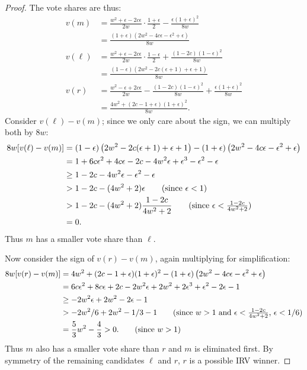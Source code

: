 \documentclass{article}
\theoremstyle{theorem}
\theoremstyle{definition}
\begin{document}
\begin{proof}
The vote shares are thus:
\begin{align*}
  v(m)   &= \frac{w^2 + \epsilon - 2c\epsilon}{2w} \cdot \frac{1+\epsilon}{2} - \frac{\epsilon  (1+\epsilon)^2}{8 w} \\
  &= \frac{(1+\epsilon) \left(2 w^2-4 c \epsilon-\epsilon ^2+\epsilon \right)}{8 w}\\[0.5em]
  v(\ell)   &= \frac{w^2 + \epsilon - 2c\epsilon}{2w} \cdot \frac{1-\epsilon}{2} + \frac{(1-2 c) (1-\epsilon)^2}{8 w} \\
  &= \frac{(1-\epsilon) \left(2 w^2-2 c (\epsilon +1)+\epsilon +1\right)}{8 w}\\[0.5em]
    v(r)   &= \frac{w^2 - \epsilon + 2c\epsilon}{2w} - \frac{(1-2 c) (1-\epsilon)^2}{8 w} + \frac{\epsilon  (1+\epsilon)^2}{8 w}\\
    &= \frac{4 w^2 + (2 c - 1 + \epsilon) (1+\epsilon)^2}{8 w}.
\end{align*}
Consider $v(\ell) - v(m)$; since we only care about the sign, we can multiply both by $8w$:
\begin{align*}
  8w[v(\ell) - v(m)] &= (1-\epsilon) \left(2 w^2-2 c (\epsilon +1)+\epsilon +1\right) - (1+\epsilon) \left(2 w^2-4 c \epsilon-\epsilon ^2+\epsilon \right)\\
  &=1 + 6 c \epsilon ^2+4 c \epsilon -2 c-4 w^2 \epsilon +\epsilon ^3-\epsilon ^2-\epsilon\\
  &\ge 1  -2 c-4 w^2 \epsilon -\epsilon ^2-\epsilon\\
  &> 1  -2 c-(4 w^2+2) \epsilon \tag{since $\epsilon < 1$}\\
  &> 1 - 2c -(4w^2 + 2) \frac{1 - 2c}{4w^2 + 2}\tag{since $\epsilon < \frac{1 - 2c}{4w^2 + 2}$}\\
  &= 0.
  \end{align*}
  Thus $m$ has a smaller vote share than $\ell$. 


Now consider the sign of $v(r) - v(m)$, again multiplying for simplification:
\begin{align*}
  8w[v(r) - v(m)] &= 4 w^2 + (2 c - 1 + \epsilon) (1+\epsilon)^2 - (1+\epsilon) \left(2 w^2-4 c \epsilon-\epsilon ^2+\epsilon \right)\\
  &= 6 c \epsilon ^2+8 c \epsilon +2 c-2 w^2 \epsilon +2 w^2+2 \epsilon ^3+\epsilon ^2-2 \epsilon -1\\
  &\ge -2 w^2 \epsilon +2 w^2 -2 \epsilon -1\\
  &> -2w^2 / 6 + 2w^2 - 1/3 - 1 \tag{since $w > 1$ and $\epsilon <\frac{1-2c}{4w^2 + 2}$, $\epsilon < 1/6$}\\
  &= \frac{5}{3}w^2 - \frac{4}{3} > 0. \tag{since $w > 1$}
\end{align*}
Thus $m$ also has a smaller vote share than $r$ and $m$ is eliminated first. By symmetry of the remaining candidates $\ell$ and $r$, $r$ is a possible IRV winner.
\end{proof}
\end{document}
